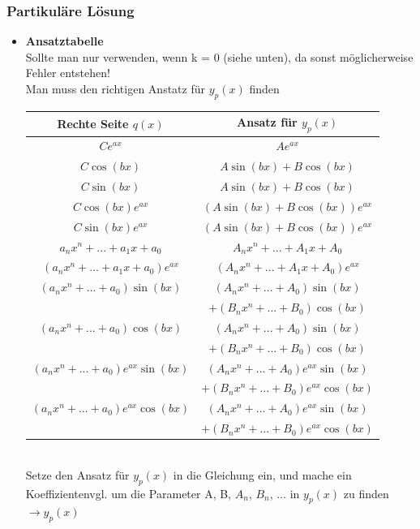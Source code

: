 \documentclass[8pt, a4paper, landscape, fleqn]{scrartcl}
\begin{document}
\begin{multicols*}{3}
				\subsubsection{Partikuläre Lösung}
				\begin{itemize}
				    \item \textbf{Ansatztabelle}\\
				    Sollte man nur verwenden, wenn k = 0 (siehe unten), da sonst möglicherweise Fehler entstehen!\\
				    Man muss den richtigen Anstatz für $y_p(x)$ finden
				    \vspace{7pt}
				    \hspace{-14pt}
				    \begin{tabular}{|c|c|}
						\hline
						Rechte Seite $q(x)$ & Ansatz für $y_p(x)$\\
						\hline
						\hline
						$Ce^{ax}$ &  $Ae^{ax}$\\
						$C\cos(bx)$ & $A\sin(bx) + B\cos(bx)$\\
						$C\sin(bx)$ & $A\sin(bx) + B\cos(bx)$\\
						$C\cos(bx)e^{ax}$ & $(A\sin(bx) + B\cos(bx))e^{ax}$\\
						$C\sin(bx)e^{ax}$ & $(A\sin(bx) + B\cos(bx))e^{ax}$\\
						\hline
						$a_n x^n + ... + a_1 x + a_0$ & $A_n x^n + ... + A_1 x + A_0$\\
						
						$(a_n x^n + ... + a_1 x + a_0)e^{ax}$ & $(A_n x^n + ... + A_1 x + A_0)e^{ax}$\\
						\hline
						$(a_n x^n + ... + a_0)\sin(bx)$ & $(A_n x^n + ... + A_0)\sin(bx)$\\
						& $+(B_n x^n + ... + B_0)\cos(bx)$\\
						
						$(a_n x^n + ... + a_0)\cos(bx)$ & $(A_n x^n + ... + A_0)\sin(bx)$\\
						& $+(B_n x^n + ... + B_0)\cos(bx)$\\
						
						$(a_n x^n + ... + a_0)e^{ax}\sin(bx)$ & $(A_n x^n + ... + A_0)e^{ax}\sin(bx)$\\
						& $+(B_n x^n + ... + B_0)e^{ax}\cos(bx)$\\
						
						$(a_n x^n + ... + a_0)e^{ax}\cos(bx)$ & $(A_n x^n + ... + A_0)e^{ax}\sin(bx)$\\
						& $+(B_n x^n + ... + B_0)e^{ax}\cos(bx)$\\
						\hline
					\end{tabular}\\
					Setze den Ansatz für $y_p(x)$ in die Gleichung ein, und mache ein Koeffizientenvgl. um die Parameter A, B, $A_n$, $B_n$, $\dots$ in $y_p(x)$ zu finden $\rightarrow y_p(x)$
					

\end{itemize}
\end{multicols*}
\end{document}
